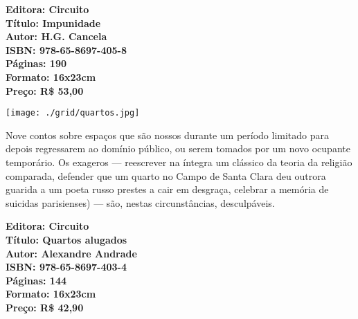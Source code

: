 \hspace*{-.4cm}\begin{minipage}[c]{1\linewidth}
\small\textbf{
\hspace*{-.1cm}Editora: Circuito\\
Título: Impunidade\\
Autor: H.G. Cancela\\ 
ISBN: 978-65-8697-405-8\\
Páginas: 190\\
Formato: 16x23cm\\
Preço: R\$ 53,00\\
}
\end{minipage}

\pagebreak

\begin{center}
\hspace*{.5cm}\texttt{[image: ./grid/quartos.jpg]}
\end{center}

\hspace*{-7cm}\hrulefill\hspace*{-7cm}

\medskip

\noindent{}Nove contos sobre espaços que são nossos durante um período limitado para depois	regressarem ao domínio público, ou serem tomados por um novo ocupante temporário.
 Os exageros
--- reescrever na íntegra um clássico da teoria da religião comparada, defender que um
quarto no Campo de Santa Clara deu outrora guarida a um poeta russo prestes a cair
em desgraça, celebrar a memória de suicidas parisienses) --- são, nestas circunstâncias,
desculpáveis.


\vfill

\hspace*{-.4cm}\begin{minipage}[c]{1\linewidth}
\small\textbf{
\hspace*{-.1cm}Editora: Circuito\\
Título: Quartos alugados\\
Autor: Alexandre Andrade\\ 
ISBN: 978-65-8697-403-4\\
Páginas: 144\\
Formato: 16x23cm\\
Preço: R\$ 42,90\\
}
\end{minipage}



